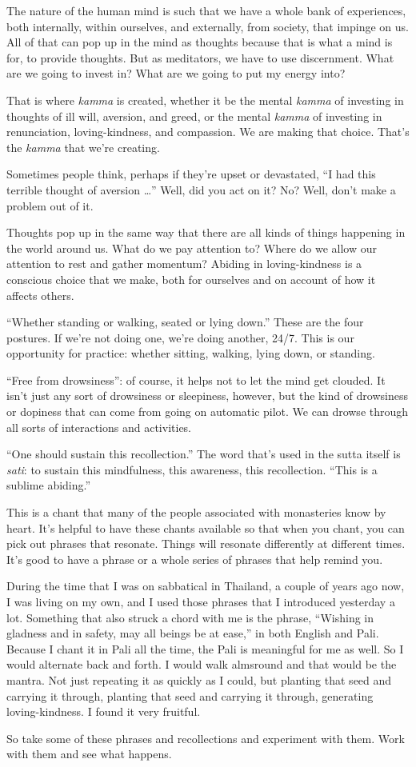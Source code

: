 The nature of the human mind is such that we have a whole bank of
experiences, both internally, within ourselves, and externally, from
society, that impinge on us. All of that can pop up in the mind as
thoughts because that is what a mind is for, to provide thoughts. But as
meditators, we have to use discernment. What are we going to invest in?
What are we going to put my energy into?

That is where \emph{kamma} is created, whether it be the mental
\emph{kamma} of investing in thoughts of ill will, aversion, and greed,
or the mental \emph{kamma} of investing in renunciation,
loving-kindness, and compassion. We are making that choice. That’s the
\emph{kamma} that we’re creating.

Sometimes people think, perhaps if they’re upset or devastated, “I had
this terrible thought of aversion \ldots{}” Well, did you act on it? No?
Well, don’t make a problem out of it.

Thoughts pop up in the same way that there are all kinds of things
happening in the world around us. What do we pay attention to? Where do
we allow our attention to rest and gather momentum? Abiding in
loving-kindness is a conscious choice that we make, both for ourselves
and on account of how it affects others.

“Whether standing or walking, seated or lying down.” These are the four
postures. If we’re not doing one, we’re doing another, 24/7. This is our
opportunity for practice: whether sitting, walking, lying down, or
standing.

“Free from drowsiness”: of course, it helps not to let the mind get
clouded. It isn’t just any sort of drowsiness or sleepiness, however,
but the kind of drowsiness or dopiness that can come from going on
automatic pilot. We can drowse through all sorts of interactions and
activities.

“One should sustain this recollection.” The word that’s used in the
sutta itself is \emph{sati}: to sustain this mindfulness, this
awareness, this recollection. “This is a sublime abiding.”

This is a chant that many of the people associated with monasteries know
by heart. It’s helpful to have these chants available so that when you
chant, you can pick out phrases that resonate. Things will resonate
differently at different times. It’s good to have a phrase or a whole
series of phrases that help remind you.

During the time that I was on sabbatical in Thailand, a couple of years
ago now, I was living on my own, and I used those phrases that I
introduced yesterday a lot. Something that also struck a chord with me
is the phrase, “Wishing in gladness and in safety, may all beings be at
ease,” in both English and Pali. Because I chant it in Pali all the
time, the Pali is meaningful for me as well. So I would alternate back
and forth. I would walk almsround and that would be the mantra. Not just
repeating it as quickly as I could, but planting that seed and carrying
it through, planting that seed and carrying it through, generating
loving-kindness. I found it very fruitful.

So take some of these phrases and recollections and experiment with
them. Work with them and see what happens.
